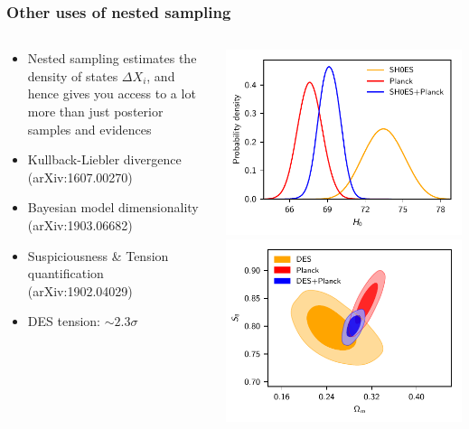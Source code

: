 \documentclass[%
]{beamer}
\begin{document}
\begin{frame}
    \frametitle{Other uses of nested sampling}
    \begin{columns}
        \begin{column}{0.55\textwidth}
        \begin{itemize}
        \item Nested sampling estimates the density of states $\Delta X_i$, and hence gives you access to a lot more than just posterior samples and evidences
        \item Kullback-Liebler divergence (arXiv:1607.00270)
        \item Bayesian model dimensionality (arXiv:1903.06682)
        \item Suspiciousness \& Tension quantification (arXiv:1902.04029)
        \item DES tension: $\sim2.3\sigma$
        \end{itemize}
        \end{column}
        \begin{column}{0.45\textwidth}
            \includegraphics[width=\textwidth]{./figures/H0.pdf}
            \includegraphics[width=\textwidth]{./figures/s8.pdf}
        \end{column}
    \end{columns}
\end{frame}
\end{document}
